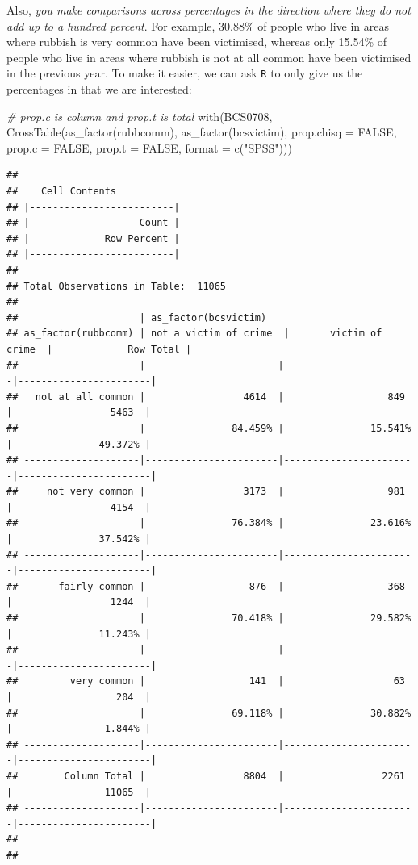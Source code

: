 \documentclass[
]{book}
\newenvironment{Shaded}{\begin{snugshade}}{\end{snugshade}}
\newcommand{\AttributeTok}[1]{\textcolor[rgb]{0.77,0.63,0.00}{#1}}
\newcommand{\CommentTok}[1]{\textcolor[rgb]{0.56,0.35,0.01}{\textit{#1}}}
\newcommand{\ConstantTok}[1]{\textcolor[rgb]{0.00,0.00,0.00}{#1}}
\newcommand{\FunctionTok}[1]{\textcolor[rgb]{0.00,0.00,0.00}{#1}}
\newcommand{\NormalTok}[1]{#1}
\newcommand{\StringTok}[1]{\textcolor[rgb]{0.31,0.60,0.02}{#1}}
\begin{document}
Also, \emph{you make comparisons across percentages in the direction where they do not add up to a hundred percent}. For example, 30.88\% of people who live in areas where rubbish is very common have been victimised, whereas only 15.54\% of people who live in areas where rubbish is not at all common have been victimised in the previous year. To make it easier, we can ask \texttt{R} to only give us the percentages in that we are interested:

\begin{Shaded}
\begin{Highlighting}[]
\CommentTok{\# prop.c is column and prop.t is total}
\FunctionTok{with}\NormalTok{(BCS0708, }\FunctionTok{CrossTable}\NormalTok{(}\FunctionTok{as\_factor}\NormalTok{(rubbcomm), }
                         \FunctionTok{as\_factor}\NormalTok{(bcsvictim), }
                         \AttributeTok{prop.chisq =} \ConstantTok{FALSE}\NormalTok{, }\AttributeTok{prop.c =} \ConstantTok{FALSE}\NormalTok{, }\AttributeTok{prop.t =} \ConstantTok{FALSE}\NormalTok{, }\AttributeTok{format =}
                           \FunctionTok{c}\NormalTok{(}\StringTok{"SPSS"}\NormalTok{)))}
\end{Highlighting}
\end{Shaded}

\begin{verbatim}
## 
##    Cell Contents
## |-------------------------|
## |                   Count |
## |             Row Percent |
## |-------------------------|
## 
## Total Observations in Table:  11065 
## 
##                     | as_factor(bcsvictim) 
## as_factor(rubbcomm) | not a victim of crime  |       victim of crime  |             Row Total | 
## --------------------|-----------------------|-----------------------|-----------------------|
##   not at all common |                 4614  |                  849  |                 5463  | 
##                     |               84.459% |               15.541% |               49.372% | 
## --------------------|-----------------------|-----------------------|-----------------------|
##     not very common |                 3173  |                  981  |                 4154  | 
##                     |               76.384% |               23.616% |               37.542% | 
## --------------------|-----------------------|-----------------------|-----------------------|
##       fairly common |                  876  |                  368  |                 1244  | 
##                     |               70.418% |               29.582% |               11.243% | 
## --------------------|-----------------------|-----------------------|-----------------------|
##         very common |                  141  |                   63  |                  204  | 
##                     |               69.118% |               30.882% |                1.844% | 
## --------------------|-----------------------|-----------------------|-----------------------|
##        Column Total |                 8804  |                 2261  |                11065  | 
## --------------------|-----------------------|-----------------------|-----------------------|
## 
## 
\end{verbatim}
\end{document}
